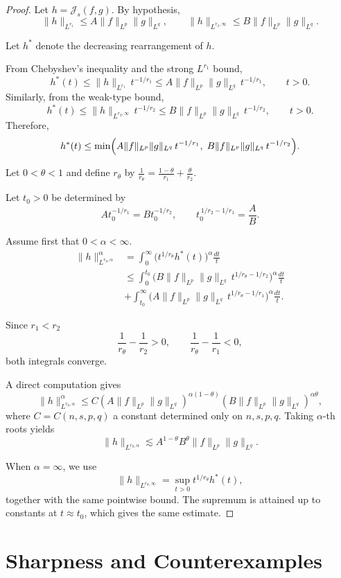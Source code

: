 \documentclass[12pt]{article}
\theoremstyle{definition}
\theoremstyle{remark}
\numberwithin{equation}{section}
\begin{document}
\begin{proof}
Let $h=\mathcal J_s(f,g)$.
By hypothesis,
\[
\|h\|_{L^{r_1}}
\le A\|f\|_{L^p}\|g\|_{L^q},
\qquad
\|h\|_{L^{r_2,\infty}}
\le B\|f\|_{L^p}\|g\|_{L^q}.
\]

Let $h^*$ denote the decreasing rearrangement of $h$.

From Chebyshev's inequality and the strong $L^{r_1}$ bound,
\[
h^*(t)
\le
\|h\|_{L^{r_1}}\,t^{-1/r_1}
\le
A\|f\|_{L^p}\|g\|_{L^q}\,t^{-1/r_1},
\qquad t>0.
\]
Similarly, from the weak-type bound,
\[
h^*(t)
\le
\|h\|_{L^{r_2,\infty}}\,t^{-1/r_2}
\le
B\|f\|_{L^p}\|g\|_{L^q}\,t^{-1/r_2},
\qquad t>0.
\]
Therefore,
\[
h^*(t)
\le
\min\Bigl(
A\|f\|_{L^p}\|g\|_{L^q}\,t^{-1/r_1},
\;
B\|f\|_{L^p}\|g\|_{L^q}\,t^{-1/r_2}
\Bigr).
\]

Let $0<\theta<1$ and define $r_\theta$ by
$\frac1{r_\theta}
=
\frac{1-\theta}{r_1}
+
\frac{\theta}{r_2}$.


Let $t_0>0$ be determined by
\[
A t_0^{-1/r_1}=B t_0^{-1/r_2},\qquad
t_0^{\,1/r_2-1/r_1}=\frac{A}{B}.
\]

Assume first that $0<\alpha<\infty$.
\begin{align*}
\|h\|_{L^{r_\theta,\alpha}}^\alpha&=
\int_0^\infty
\bigl(t^{1/r_\theta}h^*(t)\bigr)^\alpha
\frac{dt}{t}\\
&\le
\int_0^{t_0}
\bigl(B\|f\|_{L^p}\|g\|_{L^q}\,
t^{1/r_\theta-1/r_2}\bigr)^\alpha
\frac{dt}{t}\\
&+
\int_{t_0}^{\infty}
\bigl(A\|f\|_{L^p}\|g\|_{L^q}\,
t^{1/r_\theta-1/r_1}\bigr)^\alpha
\frac{dt}{t}.
\end{align*}

Since $r_1<r_2$
\[
\frac1{r_\theta}-\frac1{r_2}>0,
\qquad
\frac1{r_\theta}-\frac1{r_1}<0,
\]
both integrals converge.

A direct computation gives
\[
\|h\|_{L^{r_\theta,\alpha}}^\alpha
\le C
(A\|f\|_{L^p}\|g\|_{L^q})^{\alpha(1-\theta)}
(B\|f\|_{L^p}\|g\|_{L^q})^{\alpha\theta},
\]
where $C=C(n,s,p,q)$ a constant determined only on $n,s,p,q$.
Taking $\alpha$-th roots yields
\[
\|h\|_{L^{r_\theta,\alpha}}
\lesssim
A^{1-\theta}B^\theta
\|f\|_{L^p}\|g\|_{L^q}.
\]

When $\alpha=\infty$, we use
\[
\|h\|_{L^{r_\theta,\infty}}
=
\sup_{t>0} t^{1/r_\theta}h^*(t),
\]
together with the same pointwise bound.
The supremum is attained up to constants at $t\approx t_0$,
which gives the same estimate. \end{proof}

\section{Sharpness and Counterexamples}
\end{document}
